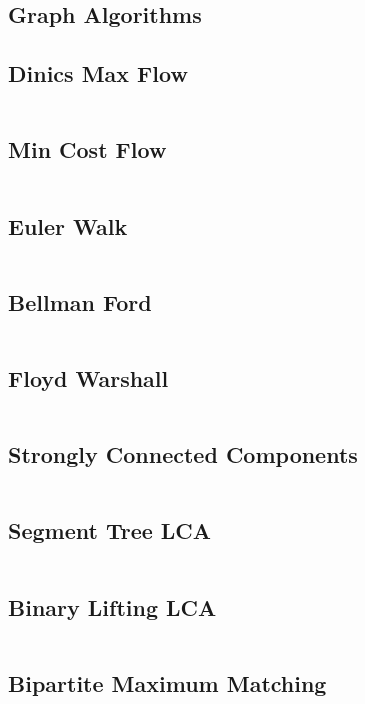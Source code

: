 \documentclass[letterpaper,landscape]{article}
\begin{document}
\begin{multicols*}{2}
  
  \section{Graph Algorithms}
  
  \subsection{Dinics Max Flow}
  \inputminted{java}{src/Graphs/DinicsMaxFlow.java}
  
  \subsection{Min Cost Flow}
  \inputminted{java}{src/Graphs/MinCostFlow.java}
  
  \subsection{Euler Walk}
  \inputminted{java}{src/Graphs/EulerWalk.java}
  
  \subsection{Bellman Ford}
  \inputminted{java}{src/Graphs/BellmanFord.java}
  
  \subsection{Floyd Warshall}
  \inputminted{java}{src/Graphs/FloydWarshall.java}
  
  \subsection{Strongly Connected Components}
  \inputminted{java}{src/Graphs/SCComponents.java}
  
  \subsection{Segment Tree LCA}
  \inputminted{java}{src/Graphs/SegmentLCA.java}
  
  \subsection{Binary Lifting LCA}
  \inputminted{cpp}{src/Graphs/BinaryLiftingLCA.cpp}
  
  \subsection{Bipartite Maximum Matching}
  \inputminted{cpp}{src/Graphs/BipartiteMaximumMatching.cpp}
  

\end{multicols*}
\end{document}
